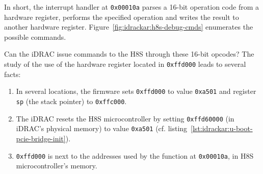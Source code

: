 In short, the interrupt handler at \texttt{0x00010a} parses a 16-bit operation code from a hardware register, performs the specified operation and writes the result to another hardware register.
Figure~\ref{fig:idrackar:h8s-debug-cmds} enumerates the possible commands.

Can the iDRAC issue commands to the H8S through these 16-bit opcodes?
The study of the use of the hardware register located in \texttt{0xffd000} leads to several facts:
\begin{enumerate}
  \item In several locations, the firmware sets \texttt{0xffd000} to value \texttt{0xa501} and register \texttt{sp} (the stack pointer) to \texttt{0xffc000}.
  \item The iDRAC resets the H8S microcontroller by setting \texttt{0xffd60000} (in iDRAC's physical memory) to value \texttt{0xa501} (cf. listing~\ref{lst:idrackar:u-boot-pcie-bridge-init}).
  \item \texttt{0xffd000} is next to the addresses used by the function at \texttt{0x00010a}, in H8S microcontroller's memory.
\end{enumerate}


